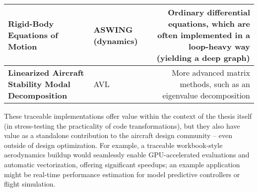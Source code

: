 \begin{table}[H]
\begin{adjustbox}{width=\textwidth}
\begin{tabularx}{1.2\textwidth}{M E D}
            \textbf{Rigid-Body Equations of Motion}                    & ASWING (dynamics) \cite{aswing}                                               & Ordinary differential equations, which are often implemented in a loop-heavy way (yielding a deep graph)                    \\ \midrule
            \textbf{Linearized Aircraft Stability Modal Decomposition} & AVL \cite{avl}                                                                & More advanced matrix methods, such as an eigenvalue decomposition                                                           \\
            \bottomrule
        \end{tabularx}

    \end{adjustbox}
\end{table}

These traceable implementations offer value within the context of the thesis itself (in stress-testing the practicality of code transformations), but they also have value as a standalone contribution to the aircraft design community -- even outside of design optimization. For example, a traceable workbook-style aerodynamics buildup would seamlessly enable GPU-accelerated evaluations and automatic vectorization, offering significant speedups; an example application might be real-time performance estimation for model predictive controllers or flight simulation.
